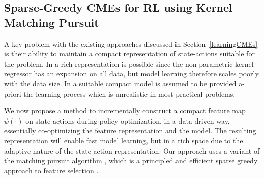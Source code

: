 \documentclass[letterpaper]{article}
\newcommand{\CsabaFLAM}{DBLP:conf/adprl/YaoSPZ14}
\newcommand{\GrunewalderEmbeddingsRL}{GrunewalderEmbeddingsMDP}
\newcommand{\MallatMatchingPursuit}{DBLP:journals/tsp/MallatZ93}
\newcommand{\ZhangMPConsistencey}{DBLP:journals/jmlr/Zhang09}
\newcommand{\HussainTheoryOfMP}{DBLP:conf/nips/HussainS08}
\begin{document}
\subsection{Sparse-Greedy CMEs for RL using Kernel Matching Pursuit} \label{FeatureLearning}

A key problem with the existing approaches discussed in Section~\ref{learningCMEs} is their ability to maintain a compact representation of state-actions suitable for the problem. In \cite{\GrunewalderEmbeddingsRL} a rich representation is possible since the non-parametric kernel regressor has an expansion on all data, but model learning therefore scales poorly with the data size. In \cite{\CsabaFLAM} a suitable compact model is assumed to be provided a-priori the learning process which is unrealistic in most practical problems.

We now propose a method to incrementally construct a compact feature map $\psi(\cdot)$ on state-actions during policy optimization, in a data-driven way, essentially co-optimizing the feature representation and the model. The resulting representation will enable fast model learning, but in a rich space due to the adaptive nature of the state-action representation. Our approach uses a variant of the matching pursuit algorithm \citep{\MallatMatchingPursuit}, which is a principled and efficient sparse greedy approach to feature selection \citep{\ZhangMPConsistencey,\HussainTheoryOfMP}.
\end{document}
